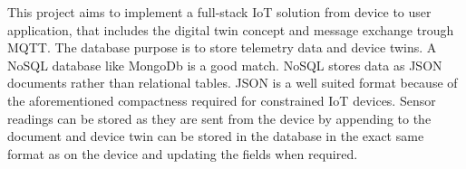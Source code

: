 This project aims to implement a full-stack IoT solution from device to user application, that includes the digital twin concept and message exchange trough MQTT. 
The database purpose is to store telemetry data and device twins. A NoSQL database like MongoDb is a good match. NoSQL stores data as JSON documents rather than relational tables. JSON is a well suited format because of the aforementioned compactness required for constrained IoT devices. Sensor readings can be stored as they are sent from the device by appending to the document and device twin can be stored in the database in the exact same format as on the device and updating the fields when required. 
